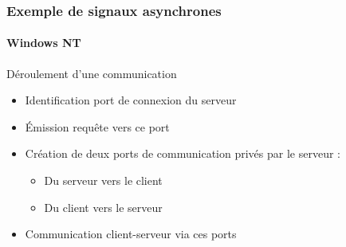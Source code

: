 \begin{frame}
\frametitle{Exemple de signaux asynchrones}
\framesubtitle{Windows NT}
\begin{block}{Déroulement d'une communication}
\begin{itemize}
\item <1->Identification port de connexion du serveur
\item <2->Émission requête vers ce port
\item <3->Création de deux ports de communication privés par le serveur :
\begin{itemize}
\item Du serveur vers le client
\item Du client vers le serveur
\end{itemize}
\item <4->Communication client-serveur via ces ports
\end{itemize}
\end{block}
\end{frame}



